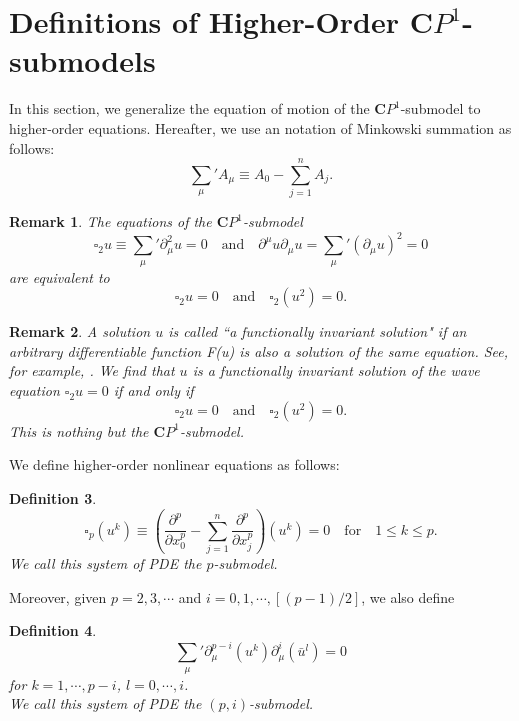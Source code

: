 \documentclass[makeidx,12pt,openany]{report}
\newtheorem{df}{Definition}[chapter]
\newtheorem{rmk}[df]{Remark}
\begin{document}
 \section{Definitions of Higher-Order ${\mathbf{C}}P^1$-submodels}
In this section, we generalize the equation of motion of 
the ${\mathbf{C}}P^1$-submodel 
to higher-order equations. Hereafter, we use an 
notation of Minkowski summation as follows: 
\begin{equation}
 \sum_{\mu}{}'A_{\mu} \equiv A_0-\sum_{j=1}^n A_j. 
\end{equation}
\begin{rmk}
The equations of the ${\mathbf{C}}P^1$-submodel 
$$
\square_2 u \equiv 
 \sum_{\mu}{}'\partial_{\mu}^2 u=0
\quad \mbox{and} \quad
 \partial^{\mu}u\partial_{\mu}u=\sum_{\mu}{}'(\partial_{\mu}u)^2=0
$$
are equivalent to
\begin{equation}
\square_2 u=0 \quad \mbox{and} \quad \square_2 (u^2)=0. 
\end{equation}
 \label{rmk:cp1sub}
\end{rmk}
\begin{rmk}
A solution $u$ is called ``a functionally invariant solution" 
if an arbitrary differentiable function F(u) is 
also a solution of the same equation. See, for example, \cite{KSG}. 
We find that $u$ is a functionally invariant solution of the wave equation 
$\square_2 u=0$ if and only if 
$$
\square_2 u=0 \quad \mbox{and} \quad \square_2 (u^2)=0. 
$$
This is nothing but the ${\mathbf{C}}P^1$-submodel. 
\end{rmk}
We define higher-order nonlinear equations as follows:
\begin{df} 
\begin{equation}
\square_p (u^k) \equiv 
  \left(
   \frac{\partial^p}{\partial x_0^p}
   -\sum_{j=1}^n \frac{\partial^p}{\partial x_j^p}
  \right) (u^k)=0 \quad \mbox{for} \quad 1 \le k \le p .
\end{equation}
We call this system of PDE {\it{the $p$-submodel}}. 
\end{df}
Moreover, given $p=2,3,\cdots $ and $i=0,1,\cdots,[(p-1)/2]$, 
we also define
\begin{df}
\begin{equation}
 \sum_{\mu}{}'\partial_{\mu}^{p-i}(u^k)
   \partial_{\mu}^i(\bar{u}^l)=0
 \label{eqn:4-4}
\end{equation}
for $k=1,\cdots, p-i$, $l=0,\cdots,i$. \\
We call this system of PDE the $(p,i)$-submodel. 
\end{df}
\end{document}
